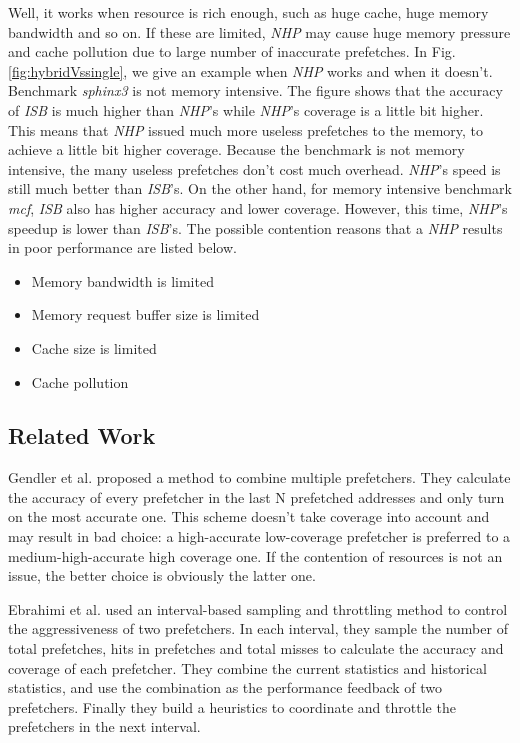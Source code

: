   Well, it works when resource is rich enough, such as huge cache, huge memory bandwidth and so on. If these are limited, \emph{NHP} may cause huge memory pressure and cache pollution due to large number of inaccurate prefetches. In Fig.\ref{fig:hybridVssingle}, we give an example when \emph{NHP} works and when it doesn't. 
 Benchmark \emph{sphinx3} is not memory intensive. The figure shows that the accuracy of \emph{ISB} is much higher than \emph{NHP}'s while \emph{NHP}'s coverage is a little bit higher. This means that \emph{NHP} issued much more useless prefetches to the memory, to achieve a little bit higher coverage. Because the benchmark is not memory intensive, the many useless prefetches don't cost much overhead. \emph{NHP}'s speed is still much better than \emph{ISB}'s. 
 On the other hand, for memory intensive benchmark \emph{mcf}, \emph{ISB} also has higher accuracy and lower coverage. However, this time, \emph{NHP}'s speedup is lower than \emph{ISB}'s. The possible contention reasons that a \emph{NHP} results in poor performance are listed below.

  \begin{itemize}
    \item Memory bandwidth is limited
    \item Memory request buffer size is limited
    \item Cache size is limited
    \item Cache pollution
  \end{itemize}

  \subsection{Related Work}
  \label{sec:PrevSol}
  Gendler et al.\cite{gendlerpaper} proposed a method to combine multiple prefetchers. 
  They calculate the accuracy of every prefetcher in the last N prefetched addresses and only turn on the most accurate one. 
  This scheme doesn't take coverage into account and may result in bad choice: a high-accurate low-coverage prefetcher is preferred to a medium-high-accurate high coverage one. 
  If the contention of resources is not an issue, the better choice is obviously the latter one. \par
  Ebrahimi et al.\cite{yalepaper} used an interval-based sampling and throttling method to control the aggressiveness of two prefetchers. 
  In each interval, they sample the number of total prefetches, hits in prefetches and total misses to calculate the accuracy and coverage of each prefetcher. 
  They combine the current statistics and historical statistics, and use the combination as the performance feedback of two prefetchers. 
  Finally they build a heuristics to coordinate and throttle the prefetchers in the next interval.
  
